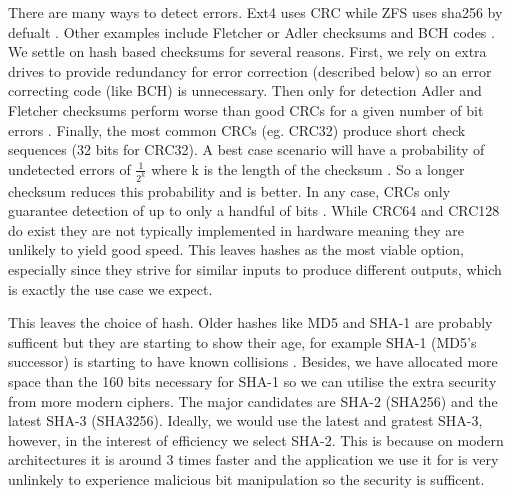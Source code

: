
        There are many ways to detect errors. Ext4 uses CRC \cite{ext4_docs}
        while ZFS uses sha256 by defualt \cite{ZFS_docs}. Other examples
        include Fletcher or Adler checksums \cite{embedded_checksums} and BCH
        codes \cite{flash_error_manual}. We settle on hash based checksums for
        several reasons. First, we rely on extra drives to provide redundancy
        for error correction (described below) so an error correcting code
        (like BCH) is unnecessary. Then only for detection Adler and Fletcher
        checksums perform worse than good CRCs for a given number of bit errors
        . Finally, the most common CRCs (eg.
        CRC32) produce short check sequences (32 bits for CRC32). A best case
        scenario will have a probability of undetected errors of
        $\frac{1}{2^k}$ where k is the length of the checksum
        \cite{embedded_checksums}. So a longer checksum reduces this
        probability and is better. In any case, CRCs only guarantee detection
        of up to only a handful of bits \cite{embedded_checksums}. While CRC64
        and CRC128 do exist they are not typically implemented in hardware
        meaning they are unlikely to yield good speed. This leaves hashes as
        the most viable option, especially since they strive for similar inputs
        to produce different outputs, which is exactly the use case we expect.

        This leaves the choice of hash. Older hashes like MD5 and SHA-1
        \cite{sha1} are probably sufficent but they are starting to show their
        age, for example SHA-1 (MD5's successor) is starting to have known
        collisions \cite{SHA_collision}. Besides, we have allocated more space
        than the 160 bits necessary for SHA-1 so we can utilise the extra
        security from more modern ciphers. The major candidates are SHA-2
        \cite{sha2_analysis} (SHA256) and the latest SHA-3 \cite{sha3}
        (SHA3256). Ideally, we would use the latest and gratest SHA-3, however,
        in the interest of efficiency we select SHA-2.  This is because on
        modern architectures it is around 3 times faster \cite{hash_stats} and
        the application we use it for is very unlinkely to experience malicious
        bit manipulation so the security is sufficent.

